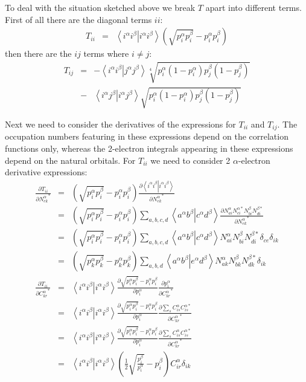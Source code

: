 \documentclass[pra]{revtex4-1}
\newcommand{\eria}[4]{\left\langle #1^\alpha #2^\beta \right.\left| #3^\alpha #4^\beta \right\rangle}
\begin{document}
To deal with the situation sketched above we break $T$ apart into different terms.
First of all there are the diagonal terms $ii$:
\begin{eqnarray}
   T_{ii} &=&  \eria{i}{i}{i}{i} \left(\sqrt{p_i^\alpha p_i^\beta}-p_i^\alpha p_i^\beta\right)
\end{eqnarray}
then there are the $ij$ terms where $i \ne j$:
\begin{eqnarray}
   T_{ij} &=&  -\eria{i}{i}{j}{j} \sqrt[4]{p_i^\alpha(1-p_i^\alpha) p_j^\beta(1-p_j^\beta)} \nonumber \\
          &-& \eria{i}{j}{i}{j} \sqrt{p_i^\alpha(1-p_i^\alpha) p_j^\beta(1-p_j^\beta)}
\end{eqnarray}

Next we need to consider the derivatives of the expressions for $T_{ii}$ and $T_{ij}$. 
The occupation numbers featuring in these expressions depend on the correlation functions only,
whereas the 2-electron integrals appearing in these expressions depend on the natural orbitals.
For $T_{ii}$ we need to consider 2 $\alpha$-electron derivative expressions:
\begin{eqnarray}
   \frac{\partial T_{ii}}{\partial \left.N_{ek}^\alpha\right.^*}
   &=& \left(\sqrt{p_i^\alpha p_i^\beta}-p_i^\alpha p_i^\beta\right)
       \frac{\partial \eria{i}{i}{i}{i}}{\partial \left.N_{ek}^\alpha\right.^*} \\
   &=& \left(\sqrt{p_i^\alpha p_i^\beta}-p_i^\alpha p_i^\beta\right)
       \sum_{a,b,c,d}\eria{a}{b}{c}{d}
       \frac{\partial N_{ai}^\alpha N_{ci}^{\alpha*}N_{bi}^\beta N_{di}^{\beta*}}
            {\partial \left.N_{ek}^\alpha\right.^*} \\
   &=& \left(\sqrt{p_i^\alpha p_i^\beta}-p_i^\alpha p_i^\beta\right)
       \sum_{a,b,c,d}\eria{a}{b}{c}{d}
       N_{ai}^\alpha N_{bi}^\beta N_{di}^{\beta*}\delta_{ce}\delta_{ik} \\
   &=& \left(\sqrt{p_k^\alpha p_k^\beta}-p_k^\alpha p_k^\beta\right)
       \sum_{a,b,d}\eria{a}{b}{e}{d}
       N_{ak}^\alpha N_{bk}^\beta N_{dk}^{\beta*}\delta_{ik} \\
   \frac{\partial T_{ii}}{\partial \left.C_{kr}^\alpha\right.^*}
   &=& \eria{i}{i}{i}{i}
       \frac{\partial\sqrt{p_i^\alpha p_i^\beta}-p_i^\alpha p_i^\beta}{\partial p_i^\alpha}
       \frac{\partial p_i^\alpha}{\partial\left.C_{kr}^\alpha\right.^*} \\
   &=& \eria{i}{i}{i}{i}
       \frac{\partial\sqrt{p_i^\alpha p_i^\beta}-p_i^\alpha p_i^\beta}{\partial p_i^\alpha}
       \frac{\partial \sum_s C_{is}^{\alpha}C_{is}^{\alpha*}}
            {\partial\left.C_{kr}^\alpha\right.^*} \\
   &=& \eria{i}{i}{i}{i}
       \frac{\partial\sqrt{p_i^\alpha p_i^\beta}-p_i^\alpha p_i^\beta}{\partial p_i^\alpha}
       \frac{\partial \sum_s C_{is}^{\alpha}C_{is}^{\alpha*}}
            {\partial\left.C_{kr}^\alpha\right.^*} \\
   &=& \eria{i}{i}{i}{i}
       \left(\frac{1}{2}\sqrt{\frac{p_i^\beta}{p_i^\alpha}}-p_i^\beta\right)
       C_{ir}^{\alpha}\delta_{ik}
\end{eqnarray}
\end{document}
